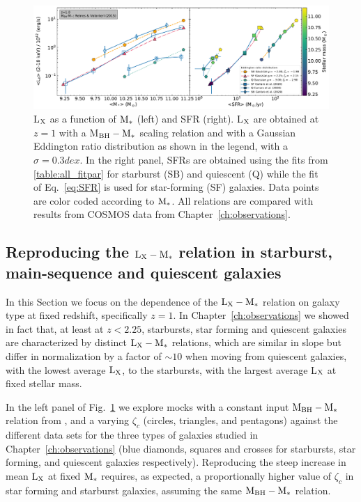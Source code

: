 \begin{figure}
\begin{center}
\includegraphics[width=\textwidth]{Figs/Chapter3/fig4.pdf} 
  \caption{L$_{\rm X}$ as a function of ${\rm M}_*$ (left) and SFR (right). L$_{\rm X}$ are obtained at $z=1$ with a \citet{2015ApJ...813...82R} M$_{\rm BH}-{\rm M}_*$ scaling relation and with a Gaussian Eddington ratio distribution as shown in the legend, with a $\sigma=0.3 dex$. In the right panel, SFRs are obtained using the fits from \ref{table:all_fitpar} for starburst (SB) and quiescent (Q) while the fit of Eq.~\ref{eq:SFR} is used for star-forming (SF) galaxies. Data points are color coded according to ${\rm M}_*$. All relations are compared with results from COSMOS data from Chapter~\ref{ch:observations}.}
    \label{fig:SFQSB}
\end{center}
\end{figure}

\subsection{Reproducing the ${\rm L}_{\rm X}-{\rm M}_*$ relation in starburst, main-sequence and quiescent galaxies} \label{subsec:SFQSB}

In this Section we focus on the dependence of the ${\rm L}_{\rm X}-{\rm M}_*$ relation on galaxy type at fixed redshift, specifically $z=1$.
In Chapter~\ref{ch:observations} we showed in fact that, at least at $z<2.25$, starbursts, star forming and quiescent galaxies are characterized by distinct ${\rm L}_{\rm X}-{\rm M}_*$ relations, which are similar in slope but differ in normalization by a factor of $\sim 10$ when moving from quiescent galaxies, with the lowest average ${\rm L}_{\rm X}$, to the starbursts, with the largest average L$_{\rm X}$ at fixed stellar mass. 

In the left panel of Fig.~\ref{fig:SFQSB} we explore mocks with a constant input ${\rm M}_{\rm BH}-{\rm M}_*$ relation from \citet{2015ApJ...813...82R}, and a varying $\zeta_c$ (circles, triangles, and pentagons) against the different data sets for the three types of galaxies studied in Chapter~\ref{ch:observations} (blue diamonds, squares and crosses for starbursts, star forming, and quiescent galaxies respectively). Reproducing the steep increase in mean ${\rm L}_{\rm X}$ at fixed ${\rm M}_*$ requires, as expected, a proportionally higher value of $\zeta_c$ in star forming and starburst galaxies, assuming the same ${\rm M}_{\rm BH}-{\rm M}_*$ relation.

